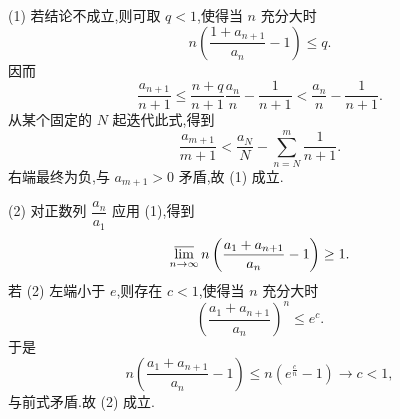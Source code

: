 \exampleblank

\begin{solution}

  (1) 若结论不成立,则可取 $q<1$,使得当 $n$ 充分大时
  \[
    n\left(\dfrac{1+a_{n+1}}{a_n}-1\right)\leq q.
  \]
  因而
  \[
    \dfrac{a_{n+1}}{n+1}
    \leq\dfrac{n+q}{n+1}\dfrac{a_n}{n}-\dfrac{1}{n+1}
    <\dfrac{a_n}{n}-\dfrac{1}{n+1}.
  \]
  从某个固定的 $N$ 起迭代此式,得到
  \[
    \dfrac{a_{m+1}}{m+1}
    <\dfrac{a_N}{N}-\sum\limits_{n=N}^m\dfrac{1}{n+1}.
  \]
  右端最终为负,与 $a_{m+1}>0$ 矛盾,故 (1) 成立.

  (2) 对正数列 $\dfrac{a_n}{a_1}$ 应用 (1),得到
  \[
    \varlimsup\limits_{n\to\infty}
    n\left(\dfrac{a_1+a_{n+1}}{a_n}-1\right)\geq1.
  \]
  若 (2) 左端小于 $e$,则存在 $c<1$,使得当 $n$ 充分大时
  \[
    \left(\dfrac{a_1+a_{n+1}}{a_n}\right)^n\leq e^c.
  \]
  于是
  \[
    n\left(\dfrac{a_1+a_{n+1}}{a_n}-1\right)
    \leq n\left(e^{\frac{c}{n}}-1\right)\longrightarrow c<1,
  \]
  与前式矛盾.故 (2) 成立.

\end{solution}
